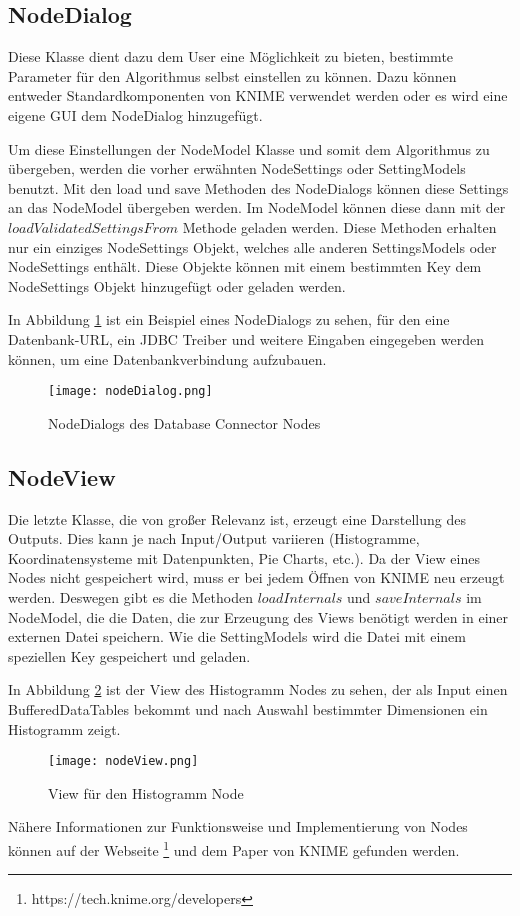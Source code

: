 \subsection{NodeDialog}
\label{ch:Analyse:sec:knime:subsec:nodeDialog}
Diese Klasse dient dazu dem User eine Möglichkeit zu bieten, bestimmte Parameter für den Algorithmus selbst einstellen zu können. 
Dazu können entweder Standardkomponenten von KNIME verwendet werden oder es wird eine eigene GUI dem NodeDialog hinzugefügt.

Um diese Einstellungen der NodeModel Klasse und somit dem Algorithmus zu übergeben, werden die vorher erwähnten NodeSettings oder SettingModels benutzt. Mit den load und save Methoden des NodeDialogs können diese Settings an das NodeModel übergeben werden. Im NodeModel können diese dann mit der $loadValidatedSettingsFrom$ Methode geladen werden. Diese Methoden erhalten nur ein einziges NodeSettings Objekt, welches alle anderen SettingsModels oder NodeSettings enthält. Diese Objekte können mit einem bestimmten Key dem NodeSettings Objekt hinzugefügt oder geladen werden.

In Abbildung \ref{img:nodeDialog} ist ein Beispiel eines NodeDialogs zu sehen, für den eine Datenbank-URL, ein JDBC Treiber und weitere Eingaben eingegeben werden können, um eine Datenbankverbindung aufzubauen.

\begin{figure}[H]
	\centering
	\texttt{[image: nodeDialog.png]}
	\caption{NodeDialogs des Database Connector Nodes}
	\label{img:nodeDialog}
\end{figure}

\subsection{NodeView}
\label{ch:Analyse:sec:knime:subsec:nodeView}
Die letzte Klasse, die von großer Relevanz ist, erzeugt eine Darstellung des Outputs. Dies kann je nach Input/Output variieren (Histogramme, Koordinatensysteme mit Datenpunkten, Pie Charts, etc.).
Da der View eines Nodes nicht gespeichert wird, muss er bei jedem Öffnen von KNIME neu erzeugt werden.
Deswegen gibt es die Methoden $loadInternals$ und $saveInternals$ im NodeModel, die die Daten, die zur Erzeugung des Views benötigt werden in einer externen Datei speichern. Wie die SettingModels wird die Datei mit einem speziellen Key gespeichert und geladen. 

In Abbildung \ref{img:nodeView} ist der View des Histogramm Nodes zu sehen, der als Input einen BufferedDataTables bekommt und nach Auswahl bestimmter Dimensionen ein Histogramm zeigt. 

\begin{figure}[H]
	\centering
	\texttt{[image: nodeView.png]}
	\caption{View für den Histogramm Node}
	\label{img:nodeView}
\end{figure}

Nähere Informationen zur Funktionsweise und Implementierung von Nodes können auf der Webseite \footnote{https://tech.knime.org/developers} und dem Paper \cite{BCDG+07} von KNIME gefunden werden.
